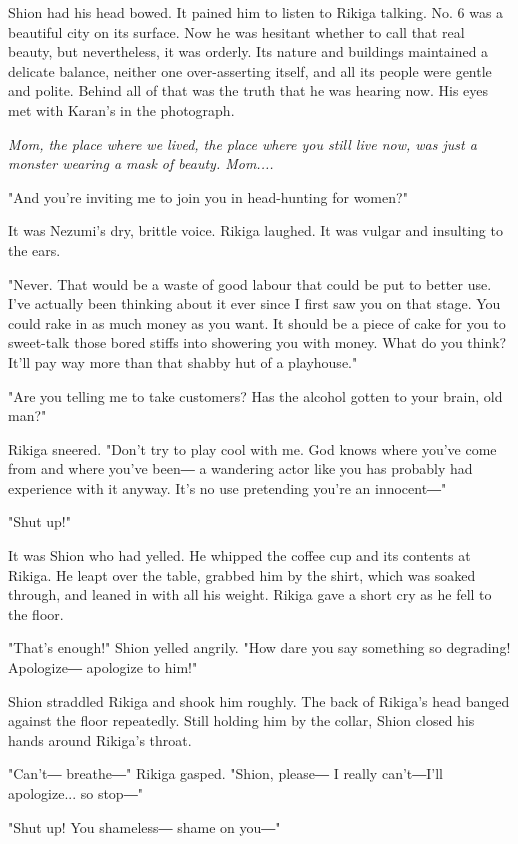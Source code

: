 Shion had his head bowed. It pained him to listen to Rikiga talking. No.
6 was a beautiful city on its surface. Now he was hesitant whether to
call that real beauty, but nevertheless, it was orderly. Its nature and
buildings maintained a delicate balance, neither one over-asserting
itself, and all its people were gentle and polite. Behind all of that
was the truth that he was hearing now. His eyes met with Karan's in the
photograph.

\emph{Mom, the place where we lived, the place where you still live now, was
	just a monster wearing a mask of beauty. Mom....}

"And you're inviting me to join you in head-hunting for women?"

It was Nezumi's dry, brittle voice. Rikiga laughed. It was vulgar and
insulting to the ears.

"Never. That would be a waste of good labour that could be put to better
use. I've actually been thinking about it ever since I first saw you on
that stage. You could rake in as much money as you want. It should be a
piece of cake for you to sweet-talk those bored stiffs into showering
you with money. What do you think? It'll pay way more than that shabby
hut of a playhouse."

"Are you telling me to take customers? Has the alcohol gotten to your
brain, old man?"

Rikiga sneered. "Don't try to play cool with me. God knows where you've
come from and where you've been― a wandering actor like you has probably
had experience with it anyway. It's no use pretending you're an
innocent―"

"Shut up!"

It was Shion who had yelled. He whipped the coffee cup and its contents
at Rikiga. He leapt over the table, grabbed him by the shirt, which was
soaked through, and leaned in with all his weight. Rikiga gave a short
cry as he fell to the floor.

"That's enough!" Shion yelled angrily. "How dare you say something so
degrading! Apologize― apologize to him!"

Shion straddled Rikiga and shook him roughly. The back of Rikiga's head
banged against the floor repeatedly. Still holding him by the collar,
Shion closed his hands around Rikiga's throat.

"Can't― breathe―" Rikiga gasped. "Shion, please― I really can't―I'll
apologize... so stop―"

"Shut up! You shameless― shame on you―"

